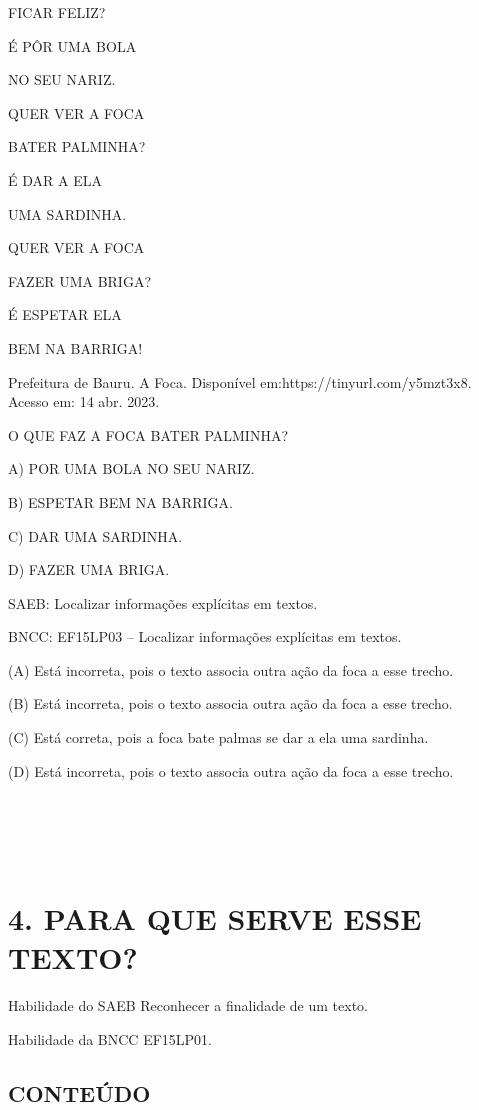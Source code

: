 FICAR FELIZ?

É PÔR UMA BOLA

NO SEU NARIZ.

QUER VER A FOCA

BATER PALMINHA?

É DAR A ELA

UMA SARDINHA.

QUER VER A FOCA

FAZER UMA BRIGA?

É ESPETAR ELA

BEM NA BARRIGA!

Prefeitura de Bauru. A Foca. Disponível em:https://tinyurl.com/y5mzt3x8. Acesso em: 14 abr. 2023.

O QUE FAZ A FOCA BATER PALMINHA?

A) POR UMA BOLA NO SEU NARIZ.

B) ESPETAR BEM NA BARRIGA.

C) DAR UMA SARDINHA.

D) FAZER UMA BRIGA.

\protect\hypertarget{_heading=h.3j2qqm3}{}{}SAEB:
Localizar informações explícitas em textos.

BNCC: EF15LP03 -- Localizar informações explícitas em textos.

(A) Está incorreta, pois o texto associa outra ação da foca a esse trecho.

(B) Está incorreta, pois o texto associa outra ação da foca a esse trecho.

(C) Está correta, pois a foca bate palmas se dar a ela uma sardinha.

(D) Está incorreta, pois o texto associa outra ação da foca a esse trecho.

\section{\texorpdfstring{\\
}{ }}\label{section-11}

\section{4. PARA QUE SERVE ESSE TEXTO?
}\label{muxf3dulo-4-por-que-esse-texto}

\protect\hypertarget{_heading=h.4i7ojhp}{}{}Habilidade do SAEB
Reconhecer a finalidade de um texto.

Habilidade da BNCC
EF15LP01.

\subsection{CONTEÚDO}\label{conteuxfado-3}

